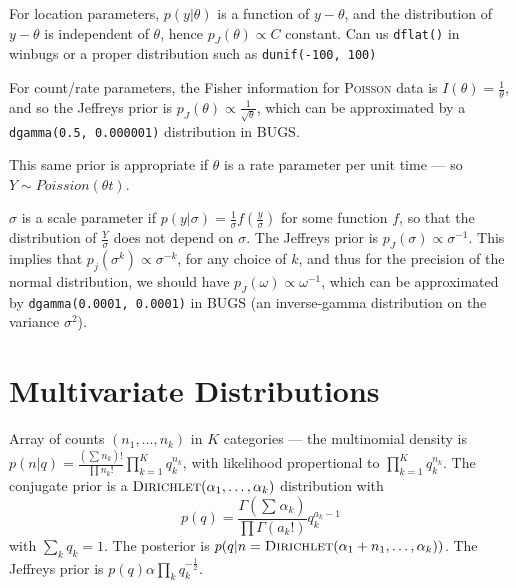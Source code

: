 \begin{defn}
  \label{sec:prior-distributions-4}
  For location parameters, $p(y|\theta)$ is a function of $y -
  \theta$, and the distribution of $y - \theta$ is independent of
  $\theta$, hence $p_{J}(\theta) \propto C$ constant. Can us
  \texttt{dflat()} in winbugs or a proper distribution such as
  \texttt{dunif(-100, 100)}
\end{defn}

\begin{defn}
  \label{sec:prior-distributions-5}
  For count/rate parameters, the Fisher information for \textsc{Poisson} data
  is $I(\theta) = \frac{1}{\theta}$, and so the Jeffreys prior is
  $p_{J}(\theta) \propto \frac{1}{\sqrt{\theta}}$, which can be
  approximated by a \texttt{dgamma(0.5, 0.000001)} distribution in
  BUGS.

  This same prior is appropriate if $\theta$ is a rate parameter per
  unit time --- so $Y \sim Poission(\theta t)$.
\end{defn}

\begin{defn}
  \label{sec:prior-distributions-6}
  $\sigma$ is a scale parameter if $p(y | \sigma) = \frac{1}{\sigma}
  f(\frac{y}{\sigma})$ for some function $f$, so that the distribution
  of $\frac{Y}{\sigma} $ does not depend on $\sigma$. The Jeffreys
  prior is $p_{J}(\sigma) \propto \sigma^{-1}$. This implies that
  $p_{j}(\sigma^{k}) \propto \sigma^{-k}$, for any choice of $k$, and
  thus for the precision of the normal distribution, we should have
  $p_{J}(\omega) \propto \omega^{-1}$, which can be approximated by
  \texttt{dgamma(0.0001, 0.0001)} in BUGS (an inverse-gamma
  distribution on the variance $\sigma^{2}$).
\end{defn}

\section{Multivariate Distributions}
\label{sec:mult-distr}

\begin{defn}
\label{sec:mult-distr-1}
  Array of counts $(n_{1}, \dots, n_{k})$ in $K$ categories --- the
  multinomial density is $p(n|q) = \frac{(\sum_{}^{} n_{k})!}{\prod
    n_{k}!} \prod_{k=1}^{K} q_{k}^{n_{k}}$, with likelihood
  propertional to $\prod_{k=1}^{K} q_{k}^{n_{k}}$. The conjugate prior
  is a $\textsc{Dirichlet}(\alpha_{1}, \dots, \alpha_{k})$ distribution with
  \begin{equation}
    \label{eq:15}
    p(q) = \frac{\Gamma(\sum_{}^{} \alpha_{k})}{\prod \Gamma(a_{k}!)}
    q_{k}^{a_{k}-1}
  \end{equation}  with $\sum_{k}^{} q_{k} = 1$.  The posterior is $p(q|n
  = \textsc{Dirichlet}(\alpha_{1} + n_{1}, \dots, \alpha_{k}))$.  The Jeffreys
  prior is $p(q) \alpha \prod_{k} q_{k}^{-\frac{1}{2}}$.
\end{defn}

